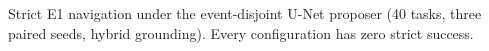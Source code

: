 \begin{table}[t]
\centering
\caption{Strict E1 navigation under the event-disjoint U-Net proposer
(40 tasks, three paired seeds, hybrid grounding). Every configuration has
zero strict success.}
\label{tab:navigation}
\resizebox{\columnwidth}{!}{
}
\end{table}
